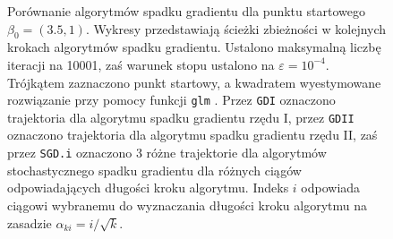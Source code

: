\begin{figure}[hbt!]
  \caption[Porównanie algorytmów spadku gradientu dla punktu startowego $\beta_0 = (3.5,1)$.]{\label{fig:sc3asd}Porównanie algorytmów spadku gradientu dla punktu startowego $\beta_0 = (3.5,1)$. Wykresy przedstawiają ścieżki zbieżności w kolejnych krokach algorytmów spadku gradientu. Ustalono maksymalną liczbę iteracji na 10001, zaś warunek stopu ustalono na $\varepsilon=10^{-4}$. Trójkątem zaznaczono punkt startowy, a kwadratem wyestymowane rozwiązanie przy pomocy funkcji \texttt{glm} \cite{glmglm}. Przez \texttt{GDI} oznaczono trajektoria dla algorytmu spadku gradientu rzędu I, przez \texttt{GDII} oznaczono trajektoria dla algorytmu spadku gradientu rzędu II, zaś przez \texttt{SGD.i} oznaczono 3 różne trajektorie dla algorytmów stochastycznego spadku gradientu dla różnych ciągów odpowiadających długości kroku algorytmu. Indeks $i$ odpowiada ciągowi wybranemu do wyznaczania długości kroku algorytmu na zasadzie $\alpha_{ki} = i/\sqrt{k}$.}
\end{figure}


